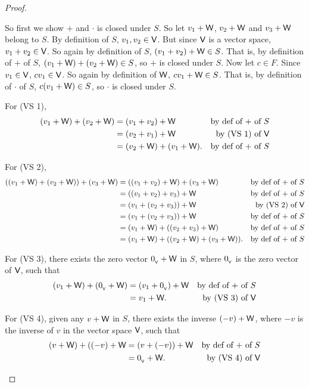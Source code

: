 \begin{proof}
\begin{enumerate}
So first we show \(+\) and \(\cdot\) is closed under \(S\).
So let \(v_1 + \textsf{W}\), \(v_2 + \textsf{W}\) and \(v_3 + \textsf{W}\) belong to \(S\).
By definition of \(S\), \(v_1, v_2 \in \textsf{V}\).
But since \(\textsf{V}\) is a vector space, \(v_1 + v_2 \in \textsf{V}\).
So again by definition of \(S\), \((v_1 + v_2) + \textsf{W} \in S\).
That is, by definition of \(+\) of \(S\), \((v_1 + \textsf{W}) + (v_2 + \textsf{W}) \in S\), so \(+\) is closed under \(S\).
Now let \(c \in F\).
Since \(v_1 \in \textsf{V}\), \(c v_1 \in \textsf{V}\).
So again by definition of \(\textsf{W}\), \(c v_1 + \textsf{W} \in S\).
That is, by definition of \(\cdot\) of \(S\), \(c(v_1 + \textsf{W}) \in S\), so \(\cdot\) is closed under \(S\).

For (VS 1),
\begin{align*}
    (v_1 + \textsf{W}) + (v_2 + \textsf{W}) & = (v_1 + v_2) + \textsf{W} & \text{by def of \(+\) of \(S\)} \\
                          & = (v_2 + v_1) + \textsf{W} & \text{by (VS 1) of \(\textsf{V}\)} \\
                          & = (v_2 + \textsf{W}) + (v_1 + \textsf{W}). & \text{by def of \(+\) of \(S\)}
\end{align*}

For (VS 2),
\begin{align*}
    ((v_1 + \textsf{W}) + (v_2 + \textsf{W})) + (v_3 + \textsf{W}) & = ((v_1 + v_2) + \textsf{W}) + (v_3 + \textsf{W}) & \text{by def of \(+\) of \(S\)} \\
                          & = ((v_1 + v_2) + v_3) + \textsf{W} & \text{by def of \(+\) of \(S\)} \\
                          & = (v_1 + (v_2 + v_3)) + \textsf{W} & \text{by (VS 2) of \(\textsf{V}\)} \\
                          & = (v_1 + (v_2 + v_3)) + \textsf{W} & \text{by def of \(+\) of \(S\)} \\
                          & = (v_1 + \textsf{W}) + ((v_2 + v_3) + \textsf{W}) & \text{by def of \(+\) of \(S\)} \\
                          & = (v_1 + \textsf{W}) + ((v_2 + \textsf{W}) + (v_3 + \textsf{W})). & \text{by def of \(+\) of \(S\)}
\end{align*}

For (VS 3), there exists the zero vector \(0_{_{\textsf{V}}} + \textsf{W}\) in \(S\), where \(0_{_{\textsf{V}}}\) is the zero vector of \(\textsf{V}\), such that
\begin{align*}
    (v_1 + \textsf{W}) + (0_{_{\textsf{V}}} + \textsf{W}) & = (v_1 + 0_{_{\textsf{V}}}) + \textsf{W} & \text{by def of \(+\) of \(S\)} \\
                          & = v_1 + \textsf{W}. & \text{by (VS 3) of \(\textsf{V}\)}
\end{align*}

For (VS 4), given any \(v + \textsf{W}\) in \(S\), there exists the inverse \((-v) + \textsf{W}\), where \(-v\) is the inverse of \(v\) in the vector space \(\textsf{V}\), such that
\begin{align*}
    (v + \textsf{W}) + ((-v) + \textsf{W} & = (v + (-v)) + \textsf{W} & \text{by def of \(+\) of \(S\)} \\
                        & = 0_{_{\textsf{V}}} + \textsf{W}. & \text{by (VS 4) of \(\textsf{V}\)}
\end{align*}


\end{enumerate}
\end{proof}
